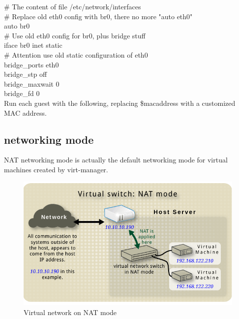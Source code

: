\# The content of file /etc/network/interfaces\\
\# Replace old eth0 config with br0, there no more "auto eth0" \\
auto br0\\
\# Use old eth0 config for br0, plus bridge stuff\\
iface br0 inet static\\
	\indent\indent \# Attention use old static configuration of eth0\\
	\indent\indent bridge\_ports    eth0\\
	\indent\indent bridge\_stp      off\\
	\indent\indent bridge\_maxwait  0\\
	\indent\indent bridge\_fd       0\\
	
Run each guest with the following, replacing \$macaddress with a customized MAC address.

\subsection{networking mode}
NAT networking mode is actually the default networking mode for virtual machines created by virt-manager.
\begin{figure}[htb]
	\centering
		\includegraphics[scale=0.5]{Figures/Figure10.png}
	\caption[Virtual network on NAT mode]{Virtual network on NAT mode}
	\label{fig:Virtual network on NAT mode}
\end{figure}


